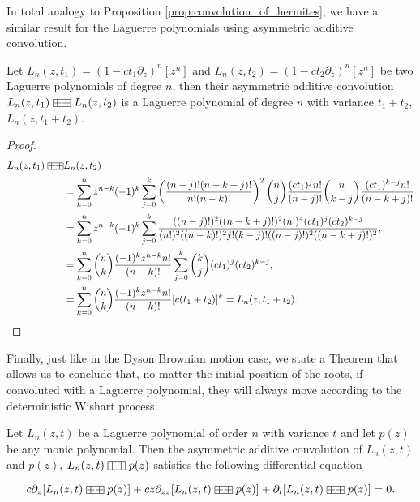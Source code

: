     In total analogy to Proposition \ref{prop:convolution_of_hermites}, we have a similar result for the Laguerre polynomials using asymmetric additive convolution.

\begin{proposition} \label{prop:convolution_of_laguerres}
    Let $L_n(z,t_1) = (1-ct_1\partial_z)^n[z^n]$ and $L_n(z,t_2) = (1-ct_2\partial_z)^n[z^n]$ be two Laguerre polynomials of degree $n$, then their asymmetric additive convolution $L_n(z,t_1) \aac L_n(z,t_2)$ is a Laguerre polynomial of degree $n$ with variance $t_1+t_2$, $L_n(z,t_1+t_2)$. 
\end{proposition}

\begin{proof}
    \begin{align*}
        L_n(z,t_1) \aac& L_n(z,t_2) \\
        &= \sum_{k=0}^n z^{n-k}(-1)^k \sum_{j=0}^k \left(\frac{(n-j)!(n-k+j)!}{n!(n-k)!}\right)^2\binom{n}{j}\frac{(ct_1)^jn!}{(n-j)!}\binom{n}{k-j}\frac{(ct_1)^{k-j} n!}{(n-k+j)!}\\ 
        &= \sum_{k=0}^n z^{n-k}(-1)^k \sum_{j=0}^k \frac{((n-j)!)^2((n-k+j)!)^2(n!)^4(ct_1)^j(ct_2)^{k-j}}{(n!)^2((n-k)!)^2j!(k-j)!((n-j)!)^2((n-k+j)!)^2},\\ 
        &= \sum_{k=0}^n \binom{n}{k} \frac{(-1)^k z^{n-k}n!}{(n-k)!}\sum_{j=0}^k \binom{k}{j}(ct_1)^j(ct_2)^{k-j}, \\  
        &=  \sum_{k=0}^n \binom{n}{k} \frac{(-1)^k z^{n-k}n!}{(n-k)!}[c(t_1 + t_2)]^k = L_n(z,t_1 + t_2).
    \end{align*}
\end{proof}

Finally, just like in the Dyson Brownian motion case, we state a Theorem that allows us to conclude that, no matter the initial position of the roots, if convoluted with a Laguerre polynomial, they will always move according to the deterministic Wishart process.

\begin{theorem}
    Let $L_n(z,t)$ be a Laguerre polynomial of order $n$ with variance $t$ and let $p(z)$ be any monic polynomial. Then the asymmetric additive convolution of $L_n(z,t)$ and $p(z)$, $L_n(z,t) \aac p(z)$ satisfies the following differential equation

    \begin{equation*}
        c\partial_z [L_n(z,t) \aac p(z)] + cz \partial_{zz}[L_n(z,t) \aac p(z)] + \partial_t [L_n(z,t) \aac p(z)] = 0.
    \end{equation*}
\end{theorem}

